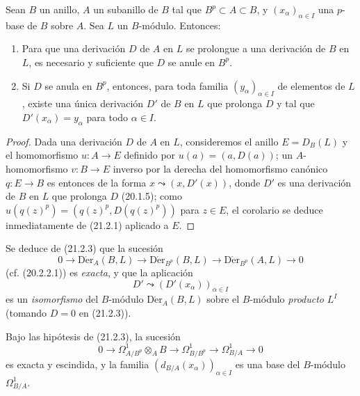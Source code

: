 \begin{corollary}[21.2.3]
\label{0.21.2.3-fr}
Sean $B$ un anillo, $A$ un subanillo de $B$ tal que $B^p\subset A\subset B$,
y $\left(x_\alpha\right)_{\alpha\in I}$ una $p$-base de $B$ sobre $A$. Sea
$L$ un $B$-módulo. Entonces:
\begin{enumerate}
  \item[\textup{(i)}] Para que una derivación $D$ de $A$ en $L$ se prolongue a una
  derivación de $B$ en $L$, es necesario y suficiente que $D$ se anule en
  $B^p$.
  \item[\textup{(ii)}] Si $D$ se anula en $B^p$, entonces, para toda familia
  $(y_\alpha)_{\alpha\in I}$ de elementos de $L$, existe una única derivación
  $D'$ de $B$ en $L$ que prolonga $D$ y tal que
  $D'(x_\alpha)=y_\alpha$ para todo $\alpha\in I$.
\end{enumerate}
\end{corollary}

\begin{proof}
Dada una derivación $D$ de $A$ en $L$, consideremos el anillo $E=D_B(L)$ y
el homomorfismo $u:A\to E$ definido por $u(a)=(a,D(a))$; un
$A$-homomorfismo $v:B\to E$ inverso por la derecha del homomorfismo canónico
$q:E\to B$ es entonces de la forma $x\leadsto(x,D'(x))$, donde $D'$ es una
derivación de $B$ en $L$ que prolonga $D$ (20.1.5); como
$u(q(z)^p)=(q(z)^p,D(q(z)^p))$ para $z\in E$, el corolario se deduce
inmediatamente de (21.2.1) aplicado a $E$.
\end{proof}

Se deduce de (21.2.3) que la sucesión
\begin{equation}
\tag{21.2.3.1}
\label{0.21.2.3.1-fr}
0\to\operatorname{D\acute{e}r}_A(B,L)\to\operatorname{D\acute{e}r}_{B^p}(B,L)
\to\operatorname{D\acute{e}r}_{B^p}(A,L)\to0
\end{equation}
(cf. (20.2.2.1)) es \emph{exacta}, y que la aplicación
\begin{equation}
\tag{21.2.3.2}
\label{0.21.2.3.2-fr}
D'\leadsto(D'(x_\alpha))_{\alpha\in I}
\end{equation}
es un \emph{isomorfismo} del $B$-módulo $\operatorname{D\acute{e}r}_A(B,L)$ sobre el
$B$-módulo \emph{producto} $L^I$ (tomando $D=0$ en (21.2.3)).

\begin{corollary}[21.2.4]
\label{0.21.2.4-fr}
Bajo las hipótesis de \textup{(21.2.3)}, la sucesión
\begin{equation}
\tag{21.2.4.1}
\label{0.21.2.4.1-fr}
0\to\Omega^1_{A/B^p}\otimes_A B\to\Omega^1_{B/B^p}
\to\Omega^1_{B/A}\to0
\end{equation}
es exacta y escindida, y la familia $(d_{B/A}(x_\alpha))_{\alpha\in I}$ es
una base del $B$-módulo $\Omega^1_{B/A}$.
\end{corollary}


